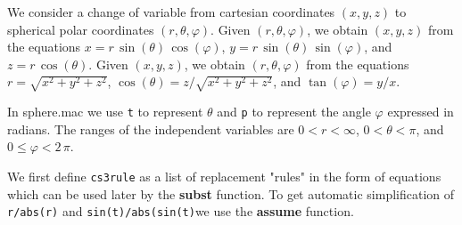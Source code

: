 \documentclass[12pt]{article}
\begin{document}
We consider a change of variable
  from cartesian coordinates $(x,y,z)$ to spherical polar
  coordinates $(r,\theta,\varphi )$.  
Given $(r,\theta,\varphi)$, we obtain $(x,y,z)$ from the  equations
 $x =  r \, \sin(\theta) \, \cos(\varphi)$,  $y = r \, \sin(\theta) \, \sin(\varphi)$,
   and $z = r \, \cos(\theta)$.
Given $(x,y,z)$, we obtain $(r,\theta,\varphi)$ from the equations
  $r = \sqrt{x^2 + y^2 + z^2}$,  $\cos(\theta) = z/\sqrt{x^2+y^2+z^2}$,
  and $\tan(\varphi) = y/x$.
  
\smallskip
In sphere.mac we use \verb|t| to represent $\theta$ and \verb|p| to represent
 the angle $\varphi$  expressed in radians.
The ranges of the independent variables are $ 0 < r < \infty$,
  $0 < \theta <  \pi$, and $0 \leq \varphi < 2\,\pi$.
  
We first define \verb|cs3rule| as a list of replacement "rules"
  in the form of equations which can be used later by the \textbf{subst} function.
To get automatic simplification of \verb|r/abs(r)| and \verb|sin(t)/abs(sin(t)|we
 use the \textbf{assume} function.  
\end{document}
